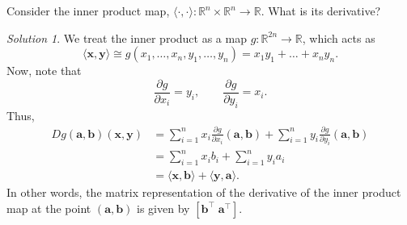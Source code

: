 \documentclass[11pt]{article}
\newcommand{\R}{\mathbb{R}}
\newcommand{\ip}[2]{\langle #1, #2 \rangle}
\renewcommand{\vec}[1]{\boldsymbol{#1}}
\newcommand{\vx}{\vec{x}}
\newcommand{\vy}{\vec{y}}
\newcommand{\va}{\vec{a}}
\newcommand{\vb}{\vec{b}}
\newcommand{\pp}[2]{\frac{\partial #1}{\partial #2}}
\theoremstyle{definition}
\theoremstyle{remark}
\newtheorem*{solution}{Solution}
\numberwithin{equation}{section}
\begin{document}
    \begin{exercise}
        Consider the inner product map, $\ip{\cdot}{\cdot}\colon \R^n \times \R^n \to
        \R$. What is its derivative?
        \begin{solution}
            We treat the inner product as a map $g\colon \R^{2n} \to \R$, which acts
            as \[
                \ip{\vx}{\vy} \cong g(x_1, \dots, x_n, y_1, \dots, y_n) = x_1y_1 +
                \dots + x_ny_n.
            \] Now, note that \[
                \pp{g}{x_i} = y_i, \qquad \pp{g}{y_i} = x_i.
            \] Thus, \begin{align*}
                Dg(\va, \vb)(\vx, \vy) &= \sum_{i = 1}^n x_i \pp{g}{x_i}(\va, \vb) +
                \sum_{i = 1}^n y_i \pp{g}{y_i}(\va, \vb) \\
                &= \sum_{i = 1}^n x_i b_i + \sum_{i = 1}^n y_i a_i \\
                &= \ip{\vx}{\vb} + \ip{\vy}{\va}.
            \end{align*}
            In other words, the matrix representation of the derivative of the inner
            product map at the point $(\va, \vb)$ is given by $[\vb^\top \;
            \va^\top]$.
        \end{solution}
    \end{exercise}
\end{document}
